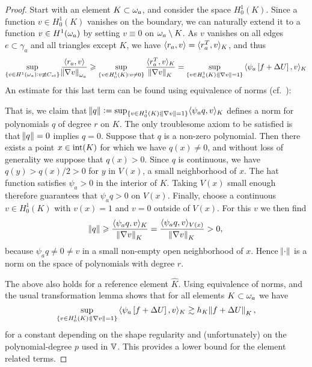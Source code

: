 \documentclass[thesis.tex]{subfiles}
\begin{document}
\begin{proof}
  Start with an element $K \subset \omega_a$, and consider the space $H_0^1(K)$. Since a function $v \in H_0^1(K)$ vanishes  on the boundary, 
  we can naturally extend it to a function $v \in H^1(\omega_a)$ by setting $v \equiv 0$ on $\omega_a \setminus K$. As $v$
  vanishes on all edges $e \subset \gamma_a$ and all triangles except $K$, we have $\langle r_a, v \rangle = \langle{r_a^T, v}\rangle_K$, and thus
  \[
    \sup_{\{v \in H^1(\omega_a) : v \not \equiv C_{st}\}} { \langle r_a, v \rangle \over \norm{\nabla v}_{\omega_a}} 
    \geqslant \sup_{\{v \in H_0^1(K) : v \ne 0\}} { \langle{r^T_a, v}\rangle_K \over \norm{\nabla v}_{K}}
    = \sup_{\{v \in H_0^1(K) :  \norm{\nabla v}=1\}} { \langle\psi_a\left[ f + \Delta U\right],v\rangle_K }
  \]
  An estimate for this last term can be found using equivalence of norms (cf.~\cite[Ex~9.x.5]{brenner}):
  
  That is, we claim that $\norm{q} := \sup_{\{v \in H_0^1(K) : \norm{\nabla v}=1\}} \langle \psi_a q, v\rangle_K$
  defines a norm for polynomials $q$ of degree $r$ on $K$. The only troublesome axiom to be satisfied
  is that $\norm{q} = 0$  implies $q=0$. Suppose that $q$ is a non-zero polynomial.
  Then there exists a point $x \in \operatorname{int}(K)$ for which we have $q(x) \ne 0$, and without loss of generality we suppose that $q(x) > 0$.
  Since $q$ is continuous, we have $q(y) > q(x) / 2 > 0$ for $y$ in $V(x)$, a small neighborhood of $x$.
  The hat function satisfies $\psi_a > 0$ in the interior of $K$. Taking $V(x)$ small enough therefore guarantees that $\psi_a q>0$ on $V(x)$.
  Finally, choose a continuous $v \in H_0^1(K)$  with $v(x) = 1$ and $v = 0$ outside of $V(x)$. For this $v$ we then find
  \[
    \norm{q} \geqslant { \langle  \psi_a q, v\rangle_K \over \norm{\nabla v}_K}  = {\langle \psi_a q, v\rangle_{V(x)} \over \norm{\nabla v}_K} > 0,
  \]
  because $\psi_a q \ne 0 \ne v$ in a small non-empty open neighborhood of $x$. Hence $\norm{\cdot}$ is a norm on the space of polynomials with degree $r$.
  
  The above also holds for a reference element $\hat K$. Using equivalence of norms, and the usual transformation lemma
  shows that for all elements $K \subset \omega_a$ we have
  \[
    \sup_{\{v \in H_0^1(K) :  \norm{\nabla v}=1\}} { \langle\psi_a\left[ f + \Delta U\right],v\rangle_K } \gtrsim h_K \norm{ f + \Delta U }_K,
  \]
  for a constant depending on the shape regularity and (unfortunately) on the polynomial-degree $p$ used in $\mathbb{V}$.  This
  provides a lower bound for the element related terms.
  

\end{proof}
\end{document}
